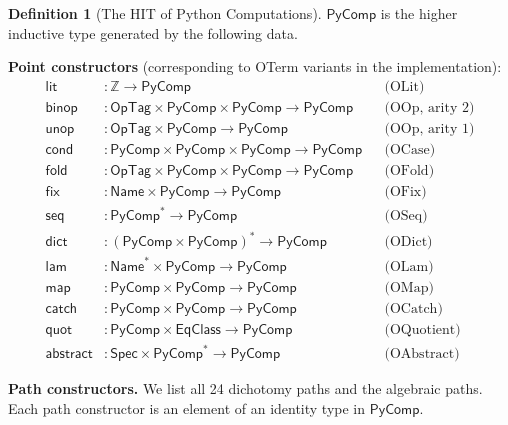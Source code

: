 \documentclass[11pt,a4paper]{report}
\theoremstyle{definition}
\newtheorem{definition}{Definition}[chapter]
\theoremstyle{plain}
\newcommand{\Int}{\mathbb{Z}}
\newcommand{\fold}{\mathsf{fold}}
\begin{document}
\begin{definition}[The HIT of Python Computations]
\label{def:pycomp}
$\mathsf{PyComp}$ is the higher inductive type generated by the following
data.

\medskip
\textbf{Point constructors} (corresponding to OTerm variants in the
implementation):
\begin{align}
  \mathsf{lit} &: \Int \to \mathsf{PyComp}
    & &\text{(OLit)} \\
  \mathsf{binop} &: \mathsf{OpTag} \times \mathsf{PyComp} \times
    \mathsf{PyComp} \to \mathsf{PyComp}
    & &\text{(OOp, arity 2)} \\
  \mathsf{unop} &: \mathsf{OpTag} \times \mathsf{PyComp} \to
    \mathsf{PyComp}
    & &\text{(OOp, arity 1)} \\
  \mathsf{cond} &: \mathsf{PyComp} \times \mathsf{PyComp} \times
    \mathsf{PyComp} \to \mathsf{PyComp}
    & &\text{(OCase)} \\
  \fold &: \mathsf{OpTag} \times \mathsf{PyComp} \times
    \mathsf{PyComp} \to \mathsf{PyComp}
    & &\text{(OFold)} \\
  \mathsf{fix} &: \mathsf{Name} \times \mathsf{PyComp} \to
    \mathsf{PyComp}
    & &\text{(OFix)} \\
  \mathsf{seq} &: \mathsf{PyComp}^* \to \mathsf{PyComp}
    & &\text{(OSeq)} \\
  \mathsf{dict} &: (\mathsf{PyComp} \times \mathsf{PyComp})^* \to
    \mathsf{PyComp}
    & &\text{(ODict)} \\
  \mathsf{lam} &: \mathsf{Name}^* \times \mathsf{PyComp} \to
    \mathsf{PyComp}
    & &\text{(OLam)} \\
  \mathsf{map} &: \mathsf{PyComp} \times \mathsf{PyComp} \to
    \mathsf{PyComp}
    & &\text{(OMap)} \\
  \mathsf{catch} &: \mathsf{PyComp} \times \mathsf{PyComp} \to
    \mathsf{PyComp}
    & &\text{(OCatch)} \\
  \mathsf{quot} &: \mathsf{PyComp} \times \mathsf{EqClass} \to
    \mathsf{PyComp}
    & &\text{(OQuotient)} \\
  \mathsf{abstract} &: \mathsf{Spec} \times \mathsf{PyComp}^* \to
    \mathsf{PyComp}
    & &\text{(OAbstract)}
\end{align}

\textbf{Path constructors.}  We list all 24 dichotomy paths and
the algebraic paths.  Each path constructor is an element of an
identity type in $\mathsf{PyComp}$.


\end{definition}
\end{document}
